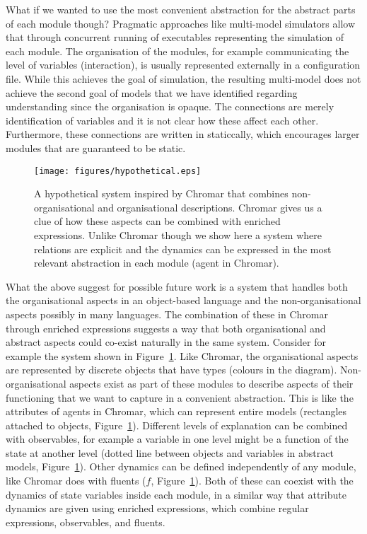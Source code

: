 What if we wanted to use the most convenient abstraction for the abstract parts
of each module though? Pragmatic approaches like multi-model simulators
\citep{erbm_mois_2015, cis_2018} allow that through concurrent running of
executables representing the simulation of each module. The organisation of the
modules, for example communicating the level of variables (interaction), is
usually represented externally in a configuration file. While this achieves the
goal of simulation, the resulting multi-model does not achieve the second goal
of models that we have identified regarding understanding since the organisation
is opaque. The connections are merely identification of variables and it is not
clear how these affect each other. Furthermore, these connections are written in
staticcally, which encourages larger modules that are guaranteed to be static.

\begin{figure}[tb]
  \centering
  \texttt{[image: figures/hypothetical.eps]}
  \caption{A hypothetical system inspired by Chromar that combines
    non-organisational and organisational descriptions. Chromar gives us a clue
    of how these aspects can be combined with enriched expressions. Unlike
    Chromar though we show here a system where relations are explicit and the
    dynamics can be expressed in the most relevant abstraction in each module
    (agent in Chromar).}
    \label{fig:hyp}
\end{figure}

What the above suggest for possible future work is a system that handles both
the organisational aspects in an object-based language and the
non-organisational aspects possibly in many languages. The combination of these
in Chromar through enriched expressions suggests a way that both organisational
and abstract aspects could co-exist naturally in the same system. Consider for
example the system shown in Figure~\ref{fig:hyp}. Like Chromar, the
organisational aspects are represented by discrete objects that have types
(colours in the diagram). Non-organisational aspects exist as part of these
modules to describe aspects of their functioning that we want to capture in a
convenient abstraction. This is like the attributes of agents in Chromar, which
can represent entire models (rectangles attached to objects,
Figure~\ref{fig:hyp}). Different levels of explanation can be combined with
observables, for example a variable in one level might be a function of the
state at another level (dotted line between objects and variables in abstract
models, Figure~\ref{fig:hyp}). Other dynamics can be defined independently of
any module, like Chromar does with fluents ($f$, Figure~\ref{fig:hyp}). Both of
these can coexist with the dynamics of state variables inside each module, in a
similar way that attribute dynamics are given using enriched expressions, which
combine regular expressions, observables, and fluents.

